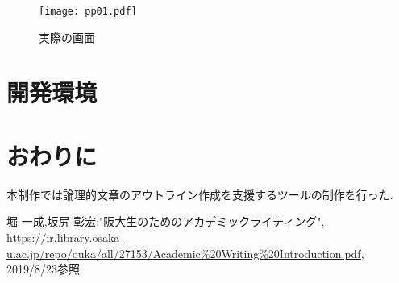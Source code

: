 \documentclass[twocolumn,10pt,a4j]{jsarticle}
\begin{document}
\begin{comment}
実装した機能として\textcircled{\scriptsize{1}}は「主張と根拠の対応」,\textcircled{\scriptsize{2}}は「課題に対する疑問とその答えの記入」,\textcircled{\scriptsize{3}}は「論理的な構成の整理」,\textcircled{\scriptsize{4}}「参考文献の管理」とする．
\textcircled{\scriptsize{1}}「主張と根拠」ではまず主張の表示をした.
また根拠は複数存在する可能性があるため根拠の追加も行えるようにした.
\textcircled{\scriptsize{2}}「問いと答え」では課題や主張への疑問とそれに対する答えを短い文章で記述し，見返した際に主張からずれた意見が出ることを防ぐことができると考え，課題や主張への疑問と答えを短い文章で記述する．
\textcircled{\scriptsize{3}}「論理的な構成」では論理的な文章を書く上で各内容の順番や序論，本論，結論のどの部分の情報なのかを整理するため順番を入れ替える機能，文章がどの章に情報なのか表示する機能にした．
\textcircled{\scriptsize{4}}「参考文献」では文章を作成する際の引用した文献を整理することが目的であり,どの文献が何章で参照を行ったのか確認できるように参考文献にはラベルを付けた.
\end{comment}

\begin{figure}[h]
\begin{center}
 \texttt{[image: pp01.pdf]}
\end{center}
 \caption{実際の画面}
 \label{fig:g}
\end{figure}

\section{開発環境}
\section{おわりに}
本制作では論理的文章のアウトライン作成を支援するツールの制作を行った.

\begin{thebibliography}{99}
 堀 一成,坂尻 彰宏:"阪大生のためのアカデミックライティング",
\url{https://ir.library.osaka-u.ac.jp/repo/ouka/all/27153/Academic%20Writing%20Introduction.pdf}, 2019/8/23参照


\end{thebibliography}
\end{document}

